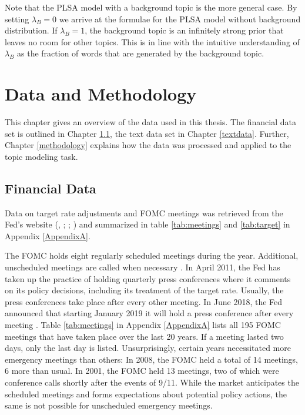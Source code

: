\documentclass[11pt,a4paper,english,oneside]{book}
\numberwithin{equation}{chapter}
\begin{document}
Note that the PLSA model with a background topic is the more general case. By setting $\lambda_B=0$ we arrive at the formulae for the PLSA model without background distribution. If $\lambda_B=1$, the background topic is an infinitely strong prior that leaves no room for other topics. This is in line with the intuitive understanding of $\lambda_B$ as the fraction of words that are generated by the background topic. 



\chapter{Data and Methodology}\label{D&M}

This chapter gives an overview of the data used in this thesis. The financial data set is outlined in Chapter \ref{Ch:financedata}, the text data set in Chapter \ref{textdata}. Further, Chapter \ref{methodology} explains how the data was processed and applied to the topic modeling task.  

\section{Financial Data}\label{Ch:financedata}

Data on target rate adjustments and FOMC meetings was retrieved from the Fed's website (\citealp{FRS.2018}, \citeyear{FRS.2013}; \citealp{FOMC.2018Archive}; \citeyear{FOMC.2018}) and summarized in table \ref{tab:meetings} and \ref{tab:target} in Appendix \ref{AppendixA}. 

The FOMC holds eight regularly scheduled meetings during the year. Additional, unscheduled meetings are called when necessary \citep{FOMC.2018}. In April 2011, the Fed has taken up the practice of holding quarterly press conferences where it comments on its policy decisions, including its treatment of the target rate. Usually, the press conferences take place after every other meeting. In June 2018, the Fed announced that starting January 2019 it will hold a press conference after every meeting \citep{PressConference.2018}. Table \ref{tab:meetings} in Appendix \ref{AppendixA} lists all 195 FOMC meetings that have taken place over the last 20 years. If a meeting lasted two days, only the last day is listed. Unsurprisingly, certain years necessitated more emergency meetings than others: In 2008, the FOMC held a total of 14 meetings, 6 more than usual. In 2001, the FOMC held 13 meetings, two of which were conference calls shortly after the events of 9/11. While the market anticipates the scheduled meetings and forms expectations about potential policy actions, the same is not possible for unscheduled emergency meetings. 
\end{document}
